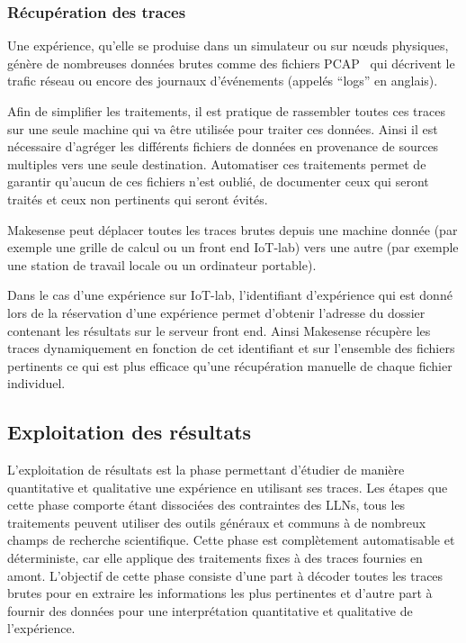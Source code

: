 \subsubsection{Récupération des traces}

Une expérience, qu'elle se produise dans un simulateur ou sur nœuds physiques, génère de nombreuses données brutes comme des fichiers \ac{PCAP}~\cite{mccanne1989libpcap} qui décrivent le trafic réseau ou encore des journaux d’événements (appelés ``logs'' en anglais).

Afin de simplifier les traitements, il est pratique de rassembler toutes ces traces sur une seule machine qui va être utilisée pour traiter ces données.
Ainsi il est nécessaire d’agréger les différents fichiers de données en provenance de sources multiples vers une seule destination.
Automatiser ces traitements permet de garantir qu'aucun de ces fichiers n'est oublié, de documenter ceux qui seront traités et ceux non pertinents qui seront évités.

Makesense peut déplacer toutes les traces brutes depuis une machine donnée (par exemple une grille de calcul ou un front end IoT-lab) vers une autre (par exemple une station de travail locale ou un ordinateur portable).

Dans le cas d'une expérience sur IoT-lab, l'identifiant d'expérience qui est donné lors de la réservation d'une expérience permet d'obtenir l'adresse du dossier contenant les résultats sur le serveur front end.
Ainsi Makesense récupère les traces dynamiquement en fonction de cet identifiant et sur l'ensemble des fichiers pertinents ce qui est plus efficace qu'une récupération manuelle de chaque fichier individuel.

\subsection{Exploitation des résultats}

L'exploitation de résultats est la phase permettant d'étudier de manière quantitative et qualitative une expérience en utilisant ses traces.
Les étapes que cette phase comporte étant dissociées des contraintes des \ac{LLN}s, tous les traitements peuvent utiliser des outils généraux et communs à de nombreux champs de recherche scientifique.
Cette phase est complètement automatisable et déterministe, car elle applique des traitements fixes à des traces fournies en amont.
L'objectif de cette phase consiste d'une part à décoder toutes les traces brutes pour en extraire les informations les plus pertinentes et d'autre part à fournir des données pour une interprétation quantitative et qualitative de l'expérience.

